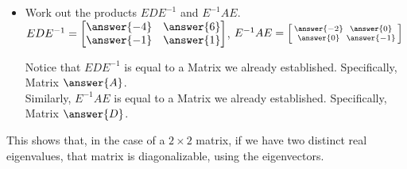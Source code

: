 \documentclass{ximera}
\begin{document}
\begin{exercise}
\begin{itemize}
        \item Work out the products $EDE^{-1}$ and $E^{-1}AE$. %
            $EDE^{-1} = \begin{bmatrix} \answer{-4} & \answer{6} \\ \answer{-1} & \answer{1} \end{bmatrix}$, $E^{-1}AE = \left[\begin{smallmatrix} \answer{-2} & \answer{0} \\ \answer{0} & \answer{-1} \end{smallmatrix}\right]$
            \begin{problem}
                Notice that $EDE^{-1}$ is equal to a Matrix we already established. Specifically, Matrix $\answer{A}$.\\
                Similarly,  $E^{-1}AE$ is equal to a Matrix we already established. Specifically, Matrix $\answer{D}$.\\
            \end{problem}
    \end{itemize}
    \begin{feedback}[correct]
        This shows that, in the case of a $2\times 2$ matrix, if we have two distinct real eigenvalues, that matrix is diagonalizable, using the eigenvectors.
    \end{feedback}
\end{exercise}
\end{document}
